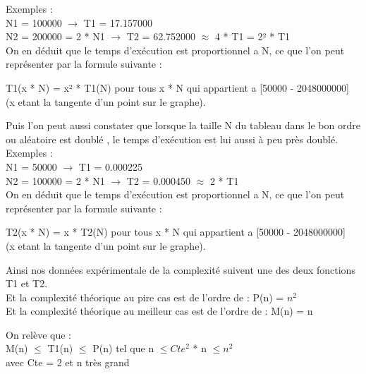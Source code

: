 \documentclass[12pt]{article}
\begin{document}
Exemples :\\
N1 = 100000 $\rightarrow$ T1 = 17.157000 \\
N2 = 200000 = 2 * N1 $\rightarrow$ T2 = 62.752000 $\approx$ 4 * T1 = 2² * T1\\

On en déduit que le temps d'exécution est proportionnel a N, ce que l'on peut représenter par la formule suivante :\\

\begin{center}

\color{red}
T1(x * N) = x² * T1(N) pour tous x * N qui appartient a [50000 - 2048000000]\\
\color{black}
(x etant la tangente d'un point sur le graphe).\\

\end{center}

 Puis l'on peut aussi constater que lorsque la taille N du \color{blue} tableau dans le bon ordre ou aléatoire \color{black} est doublé ,
 le temps d'exécution est lui aussi à peu près doublé.\\
 
 Exemples :\\
N1 = 50000 $\rightarrow$ T1 = 0.000225\\
N2 = 100000 = 2 * N1 $\rightarrow$ T2 = 0.000450 $\approx$ 2 * T1 \\

On en déduit que le temps d'exécution est proportionnel a N, ce que l'on peut représenter par la formule suivante :\\

\begin{center}

\color{red}
T2(x * N) = x * T2(N) pour tous x * N qui appartient a [50000 - 2048000000]\\
\color{black}
(x etant la tangente d'un point sur le graphe).\\

\end{center}

Ainsi nos données expérimentale de la complexité suivent une des deux fonctions T1 et T2. \\ 
Et la complexité théorique au pire cas est de l'ordre de : P(n) = $n^2$ \\
Et la complexité théorique au meilleur cas est de l'ordre de : M(n) = n \\

\begin{center}

On relève que :\\
\color{blue} 
 M(n) $\le$ T1(n) $\le$ P(n) tel que n $\le Cte^2$ * n $\le n^2$ \\
\color{black}
 avec Cte = 2 et n très grand\\
 
\end{center}
\end{document}
